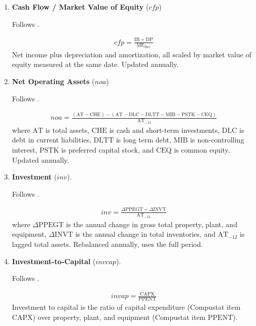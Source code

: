 \begin{enumerate}
	
	
	\item \textbf{Cash Flow / Market Value of Equity} ($cfp$) 
	
	Follows . 
	
	\begin{align*}
		cfp = \frac{ \mathrm{IB} + \mathrm{DP} }{ \mathrm{ME}_{\text{Dec}} }
	\end{align*}
	Net income plus depreciation and amortization, all scaled by market value of equity measured at the same date. Updated annually.
	
	
	
	\item \textbf{Net Operating Assets} ($noa$)
	
	Follows .
	
	\begin{align*}
		noa = \frac{ ( \mathrm{AT} - \mathrm{CHE}) - (\mathrm{AT} - \mathrm{DLC} - \mathrm{DLTT} - \mathrm{MIB} - \mathrm{PSTK} - \mathrm{CEQ} ) }{ \mathrm{AT}_{-12} }
	\end{align*}
	where $\mathrm{AT}$ is total assets, $\mathrm{CHE}$ is cash and short-term investments, $\mathrm{DLC}$ is debt in current liabilities, $\mathrm{DLTT}$ is long term debt, $\mathrm{MIB}$ is non-controlling interest, $\mathrm{PSTK}$ is preferred capital stock, and $\mathrm{CEQ}$ is common equity. Updated annually.
	
	
	
	\item \textbf{Investment} ($inv$).
	
	Follows .
	
	\begin{align*}
	inv = \frac{ \Delta \mathrm{PPEGT} + \Delta \mathrm{INVT} }{ \mathrm{AT}_{-12} }
	\end{align*}
	where $\Delta \mathrm{PPEGT}$ is the annual change in gross total property, plant, and equipment, $\Delta \mathrm{INVT}$ is the annual change in total inventories, and $\mathrm{AT}_{-12}$ is lagged total assets. Rebalanced annually, uses the full period.
	
	
	
	\item \textbf{Investment-to-Capital} ($invcap$). 
	
	Follows . 
	
	\begin{align*}
		invap = \frac{ \mathrm{CAPX} }{ \mathrm{PPENT} }
	\end{align*}
	Investment to capital is the ratio of capital expenditure (Compustat item $\mathrm{CAPX}$) over property, plant, and equipment (Compustat item $\mathrm{PPENT}$).
	

\end{enumerate}
